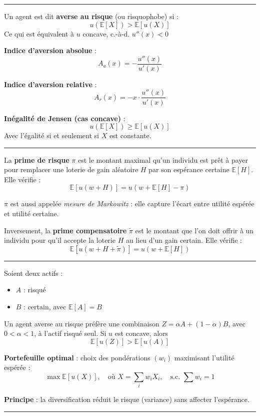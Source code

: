 \hrule

\begin{f}
	Un agent est dit \textbf{averse au risque} (ou risquophobe) si :
	\[
	u(\mathbb{E}[X]) > \mathbb{E}[u(X)]
	\]
	Ce qui est équivalent à \(u\) concave, c.-à-d. \(u''(x) < 0\)
\end{f}

\begin{f}
	\textbf{Indice d'aversion absolue} :
	\[
	A_a(x) = -\frac{u''(x)}{u'(x)}
	\]
	
	\textbf{Indice d'aversion relative} :
	\[
	A_r(x) = -x \cdot \frac{u''(x)}{u'(x)}
	\]
	
	\textbf{Inégalité de Jensen (cas concave)} :
	\[
	u(\mathbb{E}[X]) \geq \mathbb{E}[u(X)]
	\]
Avec l'égalité si et seulement si \(X\) est constante.
\end{f}
\hrule


\begin{f}
	
La \textbf{prime de risque} \(\pi\) est le montant maximal qu'un individu est prêt à payer pour remplacer une loterie de gain aléatoire \(H\) par son espérance certaine \(\mathbb{E}[H]\). Elle vérifie :
\[
\mathbb{E}[u(w + H)] = u(w + \mathbb{E}[H] - \pi)
\]


\(\pi\) est aussi appelée \emph{mesure de Markowitz} : elle capture l'écart entre utilité espérée et utilité certaine.

Inversement, la \textbf{prime compensatoire} \(\tilde{\pi}\) est le montant que l'on doit offrir à un individu pour qu’il accepte la loterie \(H\) au lieu d’un gain certain. Elle vérifie :
\[
\mathbb{E}[u(w + H + \tilde{\pi})] = u(w + \mathbb{E}[H])
\]

\end{f}
\hrule
\begin{f}
	
	Soient deux actifs :
	\begin{itemize}
		\item \(A\) : risqué
		\item \(B\) : certain, avec \(\mathbb{E}[A] = B\)
	\end{itemize}
	
	Un agent averse au risque préfère une combinaison \(Z = \alpha A + (1 - \alpha) B\), avec \(0 < \alpha < 1\), à l’actif risqué seul.
	Si  \(u\) est concave, alors
	\[
	\mathbb{E}[u(Z)] > \mathbb{E}[u(A)]
	\]
	
	\textbf{Portefeuille optimal} : choix des pondérations \((w_i)\) maximisant l'utilité espérée :
	\[
	\max \mathbb{E}[u(X)], \quad \text{où } X = \sum_{i} w_i X_i, \quad \text{s.c. } \sum w_i = 1
	\]
	
	\textbf{Principe} : la diversification réduit le risque (variance) sans affecter l’espérance.
	
	
\end{f}
\hrule

